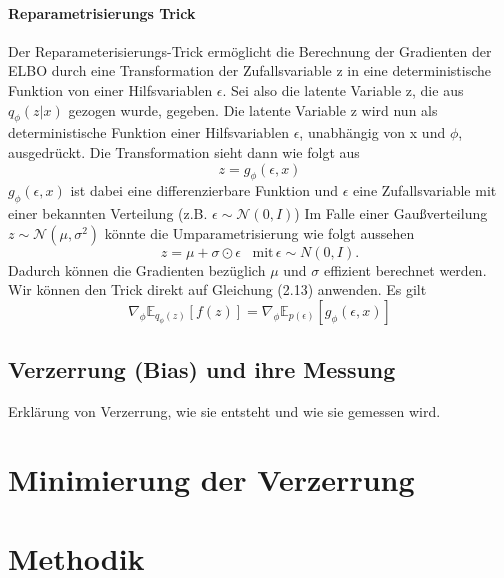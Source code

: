 \documentclass[%
thesis=student,%
coverpage=false,%
titlepage=false,%
headmarks=true, %
german,%
font=libertine, %
math=newpxtx, %
BCOR=5mm,%
coverBCOR=11mm%
]{tumbook}
\theoremstyle{break}
\begin{document}
\subsubsection{Reparametrisierungs Trick}
Der Reparameterisierungs-Trick ermöglicht die Berechnung der Gradienten der ELBO durch eine Transformation der Zufallsvariable z in eine deterministische Funktion von einer Hilfsvariablen $\epsilon$.
Sei also die latente Variable z, die aus $q_\phi(z|x)$ gezogen wurde, gegeben. Die latente Variable z wird nun als deterministische Funktion einer Hilfsvariablen $\epsilon$, unabhängig von x und $\phi$, ausgedrückt. 
Die Transformation sieht dann wie folgt aus
$$ z = g_\phi(\epsilon, x)$$
$g_\phi(\epsilon,x) $ ist dabei eine differenzierbare Funktion und $\epsilon$ eine Zufallsvariable mit einer bekannten Verteilung (z.B. $\epsilon \sim \mathcal{N}(0,I)$)
Im Falle einer Gaußverteilung $z \sim \mathcal{N}(\mu, \sigma^2)$ könnte die Umparametrisierung wie folgt aussehen 
$$z=\mu + \sigma \odot \epsilon \hspace{10pt}\text{mit} \hspace{2pt} \epsilon\sim N(0,I).$$ 
Dadurch können die Gradienten bezüglich $\mu$ und $\sigma$ effizient berechnet werden.
\\
Wir können den Trick direkt auf Gleichung (2.13) anwenden. Es gilt
$$ \nabla_\phi \mathbb{E}_{q_\phi(z)}[f(z)]= \nabla_\phi \mathbb{E}_{p(\epsilon)}[g_\phi(\epsilon,x)]$$
\section{Verzerrung (Bias) und ihre Messung}
Erklärung von Verzerrung, wie sie entsteht und wie sie gemessen wird.

\chapter{Minimierung der Verzerrung}

\chapter{Methodik}
\end{document}
